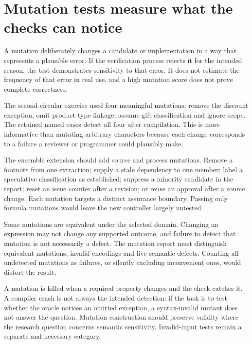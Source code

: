 \section{Mutation tests measure what the checks can notice}
\label{merge:M07:06}


A mutation deliberately changes a candidate or implementation in a way that
represents a plausible error. If the verification process rejects it for the
intended reason, the test demonstrates sensitivity to that error. It does not
estimate the frequency of that error in real use, and a high mutation score does
not prove complete correctness.

The second-circular exercise used four meaningful mutations: remove the discount
exception, omit product-type linkage, assume gift classification and ignore scope.
The retained named cases detect all four after compilation. This is more
informative than mutating arbitrary characters because each change corresponds
to a failure a reviewer or programmer could plausibly make.


The ensemble extension should add source and process mutations. Remove a footnote
from one extraction; supply a stale dependency to one member; label a speculative
classification as established; suppress a minority candidate in the report; reset
an issue counter after a revision; or reuse an approval after a source change.
Each mutation targets a distinct assurance boundary. Passing only formula
mutations would leave the new controller largely untested.

Some mutations are equivalent under the selected domain. Changing an expression
may not change any supported outcome, and failure to detect that mutation is not
necessarily a defect. The mutation report must distinguish equivalent mutations,
invalid encodings and live semantic defects. Counting all undetected mutations as
failures, or silently excluding inconvenient ones, would distort the result.

A mutation is killed when a required property changes and the check catches it.
A compiler crash is not always the intended detection: if the task is to test
whether the oracle notices an omitted exception, a syntax-invalid mutant does not
answer the question. Mutation construction should preserve validity where the
research question concerns semantic sensitivity. Invalid-input tests remain a
separate and necessary category.

